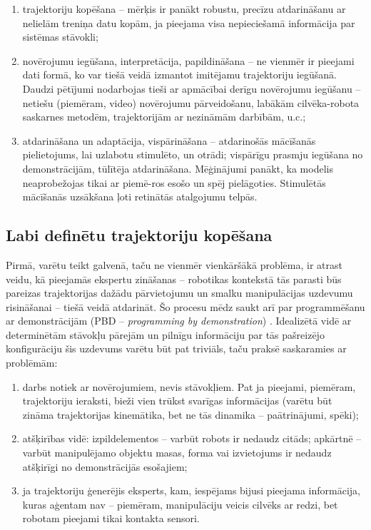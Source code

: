 \documentclass[12pt, a4paper]{article}
\numberwithin{equation}{section} %
\begin{document}
\begin{enumerate}
    \item trajektoriju kopēšana -- mērķis ir panākt robustu, precīzu atdarināšanu ar nelielām treniņa datu kopām, ja pieejama visa nepieciešamā informācija par sistēmas stāvokli;
    \item novērojumu iegūšana, interpretācija, papildināšana -- ne vienmēr ir pieejami dati formā, ko var tiešā veidā izmantot imitējamu trajektoriju iegūšanā. Daudzi pētījumi nodarbojas tieši ar apmācībai derīgu novērojumu iegūšanu -- netiešu (piemēram, video) novērojumu pārveidošanu, labākām cilvēka-robota saskarnes metodēm, trajektorijām ar nezināmām darbībām, u.c.;
    \item atdarināšana un adaptācija, vispārināšana -- atdarinošās mācīšanās pielietojums, lai uzlabotu stimulēto, un otrādi; vispārīgu prasmju iegūšana no demonstrācijām, tūlītēja atdarināšana. Mēģinājumi panākt, ka modelis neaprobežojas tikai ar piemē-ros esošo un spēj pielāgoties. Stimulētās mācīšanās uzsākšana ļoti retinātās atalgojumu telpās.
\end{enumerate}

\subsection{Labi definētu trajektoriju kopēšana}

Pirmā, varētu teikt galvenā, taču ne vienmēr vienkāršākā problēma, ir atrast veidu, kā pieejamās ekspertu zināšanas -- robotikas kontekstā tās parasti būs pareizas trajektorijas dažādu pārvietojumu un smalku manipulācijas uzdevumu risināšanai -- tiešā veidā atdarināt. Šo procesu mēdz saukt arī par programmēšanu ar demonstrācijām (PBD -- \textit{programming by demonstration}) \cite{muench1994robot,billard2008handbook}. Idealizētā vidē ar determinētām stāvokļu pārejām un pilnīgu informāciju par tās pašreizējo konfigurāciju šis uzdevums varētu būt pat triviāls, taču praksē saskaramies ar problēmām:

\begin{enumerate}
    \item darbs notiek ar novērojumiem, nevis stāvokļiem. Pat ja pieejami, piemēram, trajektoriju ieraksti, bieži vien trūkst svarīgas informācijas (varētu būt zināma trajektorijas kinemātika, bet ne tās dinamika -- paātrinājumi, spēki);
    \item atšķirības vidē: izpildelementos -- varbūt robots ir nedaudz citāds; apkārtnē -- varbūt manipulējamo objektu masas, forma vai izvietojums ir nedaudz atšķirīgi no demonstrācijās esošajiem;
    \item ja trajektoriju ģenerējis eksperts, kam, iespējams bijusi pieejama informācija, kuras aģentam nav -- piemēram, manipulāciju veicis cilvēks ar redzi, bet robotam pieejami tikai kontakta sensori.
\end{enumerate}
\end{document}
